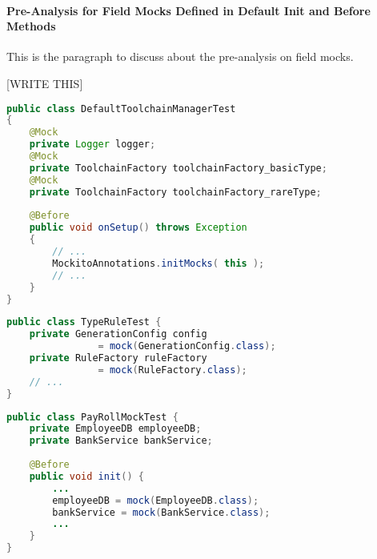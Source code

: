 \paragraph{Pre-Analysis for Field Mocks Defined in Default Init and Before Methods}
\label{subsubsec:pre-analysis} This is the paragraph to discuss about the pre-analysis on field mocks.

[WRITE THIS]

\begin{lstlisting}[basicstyle=\ttfamily, caption={Example for Annotated field mocks from \texttt{DefaultToolchainManagerTest.java} in maven-core.},
basicstyle=\scriptsize\ttfamily,language = Java, framesep=4.5mm,
framexleftmargin=1mm, captionpos=b, xleftmargin=3.5ex, label=lis:annotatedMock]
public class DefaultToolchainManagerTest
{
    @Mock
    private Logger logger;
    @Mock
    private ToolchainFactory toolchainFactory_basicType;
    @Mock
    private ToolchainFactory toolchainFactory_rareType;
    
    @Before
    public void onSetup() throws Exception
    {    
        // ...
        MockitoAnnotations.initMocks( this );
        // ...
    }
}

\end{lstlisting}

\begin{lstlisting}[basicstyle=\ttfamily, caption={Example for field mocks defined by field initializations from \texttt{TypeRuleTest.java} in jsonschema2pojo.},
basicstyle=\scriptsize\ttfamily,language = Java, framesep=4.5mm,
framexleftmargin=1mm, captionpos=b, xleftmargin=3.5ex, label=lis:fieldMock]
public class TypeRuleTest {
    private GenerationConfig config 
                = mock(GenerationConfig.class);
    private RuleFactory ruleFactory 
                = mock(RuleFactory.class);
    // ...
}

\end{lstlisting}

\begin{lstlisting}[basicstyle=\ttfamily, caption={Example for field mocks defined in Before method from \texttt{PayRollMockTest.java} in microbenchmark.},
basicstyle=\scriptsize\ttfamily,language = Java, framesep=4.5mm,
framexleftmargin=1mm, captionpos=b, xleftmargin=3.5ex, label=lis:fieldMock2]
public class PayRollMockTest {
    private EmployeeDB employeeDB;
    private BankService bankService;
    
    @Before
    public void init() {
        ...
        employeeDB = mock(EmployeeDB.class);
        bankService = mock(BankService.class);
        ...
    }
}

\end{lstlisting}

